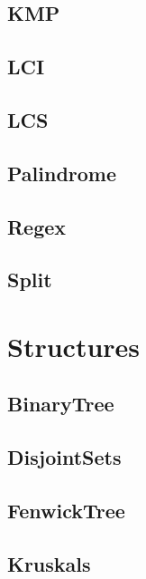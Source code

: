 \subsection{ KMP}
\raggedbottom
\hrulefill
\subsection{ LCI}
\raggedbottom
\hrulefill
\subsection{ LCS}
\raggedbottom
\hrulefill
\subsection{ Palindrome}
\raggedbottom
\hrulefill
\subsection{ Regex}
\raggedbottom
\hrulefill
\subsection{ Split}
\raggedbottom
\hrulefill

\section{Structures}
\subsection{ BinaryTree}
\raggedbottom
\hrulefill
\subsection{ DisjointSets}
\raggedbottom
\hrulefill
\subsection{ FenwickTree}
\raggedbottom
\hrulefill
\subsection{ Kruskals}
\raggedbottom
\hrulefill
